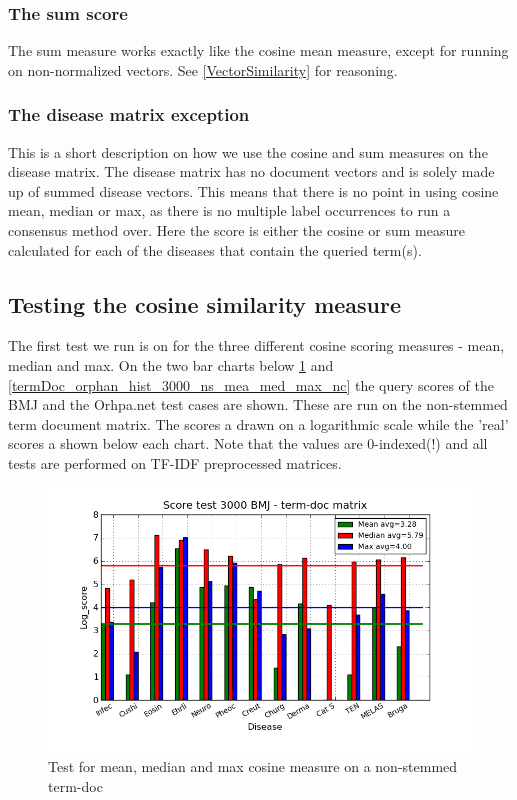 \subsubsection{The sum score}

The sum measure works exactly like the cosine mean measure, except for
running on non-normalized vectors. See \ref{VectorSimilarity} for
reasoning.

\subsubsection{The disease matrix exception}

This is a short description on how we use the cosine and sum measures
on the disease matrix. The disease matrix has no document vectors and
is solely made up of summed disease vectors. This means that there is
no point in using cosine mean, median or max, as there is no multiple
label occurrences to run a consensus method over. Here the score is
either the cosine or sum measure calculated for each of the diseases
that contain the queried term(s).

\subsection{Testing the cosine similarity measure\label{TestingCosineSimilarity}}

The first test we run is on for the three different cosine scoring
measures - mean, median and max. On the two bar charts below
\ref{termDoc_bmj_hist_3000_ns_mea_med_max_nc} and
\ref{termDoc_orphan_hist_3000_ns_mea_med_max_nc} the query scores of
the BMJ and the Orhpa.net test cases are shown. These are run on the
non-stemmed term document matrix. The scores a drawn on a logarithmic
scale while the 'real' scores a shown below each chart. Note that the
values are 0-indexed(!) and all tests are performed on TF-IDF
preprocessed matrices.

\begin{figure}[H]
  \caption{Test for mean, median and max cosine measure on a non-stemmed term-doc}
  \begin{center}
    \includegraphics[width=1.2\textwidth]{barcharts/termDoc_bmj_hist_3000_ns_mea_med_max_nc.png}
  \end{center}
  \label{termDoc_bmj_hist_3000_ns_mea_med_max_nc}
\end{figure}

